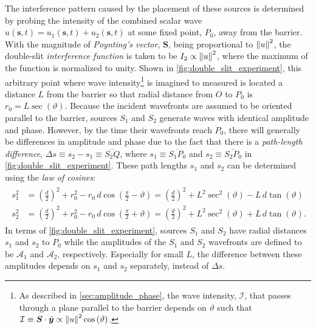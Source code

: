 The interference pattern caused by the placement of these sources is determined by probing the intensity of the combined scalar wave $u ( \mathbold{s} , t ) = u_1 ( \mathbold{s} , t ) + u_2 ( \mathbold{s} , t )$ at some fixed point, $P_0$, away from the barrier. 
With the magnitude of \emph{Poynting's vector}, $\mathbold{S}$, being proportional to $\norm{u}^2$, the double-slit \emph{interference function} is taken to be $I_2 \propto \norm{u}^2$, where the maximum of the function is normalized to unity. 
Shown in \cref{fig:double_slit_experiment}, this arbitrary point where wave intensity\footnote{As described in \cref{sec:amplitude_phase}, the wave intensity, $\mathcal{I}$, that passes through a plane parallel to the barrier depends on $\vartheta$ such that $\mathcal{I} \equiv \mathbold{S} \cdot \mathbold{\hat{y}} \propto \norm{u}^2 \cos \left( \vartheta \right)$.} is imagined to measured is located a distance $L$ from the barrier so that radial distance from $O$ to $P_0$ is $r_0 = L \sec (\vartheta)$. 
Because the incident wavefronts are assumed to be oriented parallel to the barrier, sources $S_1$ and $S_2$ generate waves with identical amplitude and phase. 
However, by the time their wavefronts reach $P_0$, there will generally be differences in amplitude and phase due to the fact that there is a \emph{path-length difference}, $\Delta s \equiv s_2 - s_1 \equiv \overline{S_2 Q}$, where $s_1 \equiv \overline{S_1 P_0}$ and $s_2 \equiv \overline{S_2 P_0}$ in \cref{fig:double_slit_experiment}. 
These path lengths $s_1$ and $s_2$ can be determined using the \emph{law of cosines}: 
\begin{align}
 \begin{split}
 s_1^2 &= \left( \frac{d}{2} \right)^2 + r_0^2 - r_0 \, d \cos \left(\frac{\pi}{2} - \vartheta \right) = \left( \frac{d}{2} \right)^2 + L^2 \sec^2 \left( \vartheta \right) - L \, d \tan \left( \vartheta \right) \\
 s_2^2 &= \left( \frac{d}{2} \right)^2 + r_0^2 - r_0 \, d \cos \left(\frac{\pi}{2} + \vartheta \right) = \left( \frac{d}{2} \right)^2 + L^2 \sec^2 \left( \vartheta \right) + L \, d \tan \left( \vartheta \right) . \label{eq:path_length_exact}
 \end{split}
 \end{align} 
In terms of \cref{fig:double_slit_experiment}, sources $S_1$ and $S_2$ have radial distances $s_1$ and $s_2$ to $P_0$ while the amplitudes of the $S_1$ and $S_2$ wavefronts are defined to be $\mathcal{A}_1$ and $\mathcal{A}_2$, respectively. 
Especially for small $L$, the difference between these amplitudes depends on $s_1$ and $s_2$ separately, instead of $\Delta s$. 
